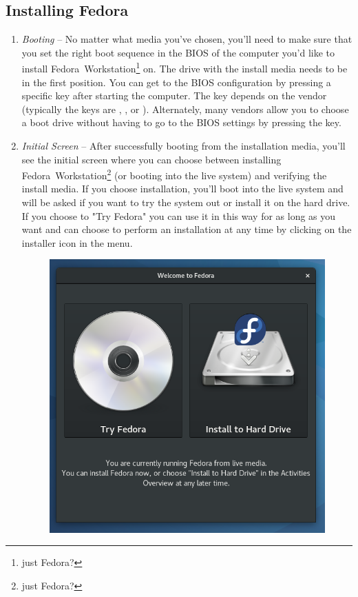 \subsection*{Installing Fedora}
\begin{enumerate}
\item\emph{Booting} -- No matter what media you've chosen, you'll need to make sure that you set the right boot sequence in the BIOS of the computer you'd like to install Fedora~Workstation\footnote{just Fedora?} on. The drive with the install media needs to be in the first position. You can get to the BIOS configuration by pressing a specific key after starting the computer. The key depends on the vendor (typically the keys are , , or ). Alternately, many vendors allow you to choose a boot drive without having to go to the BIOS settings by pressing the  key.

\item\emph{Initial Screen} -- After successfully booting from the installation media, you'll see the initial screen where you can choose between installing Fedora~Workstation\footnote{just Fedora?} (or booting into the live system) and verifying the install media. If you choose installation, you'll boot into the live system and will be asked if you want to try the system out or install it on the hard drive. If you choose to "Try Fedora" you can use it in this way for as long as you want and can choose to perform an installation at any time by clicking on the installer icon in the menu.

\begin{figure}[ht]
\begin{center}
\includegraphics[width=.75\textwidth]{img/installer-a}
 \label{fig:installer-a}
\end{center}
\end{figure}


\end{enumerate}
